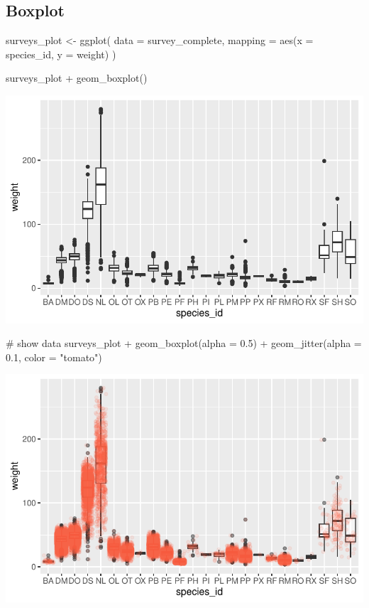 \documentclass[
  letterpaper,
  DIV=11,
  numbers=noendperiod]{scrreprt}
\newenvironment{Shaded}{\begin{snugshade}}{\end{snugshade}}
\newcommand{\AttributeTok}[1]{\textcolor[rgb]{0.40,0.45,0.13}{#1}}
\newcommand{\CommentTok}[1]{\textcolor[rgb]{0.37,0.37,0.37}{#1}}
\newcommand{\FloatTok}[1]{\textcolor[rgb]{0.68,0.00,0.00}{#1}}
\newcommand{\FunctionTok}[1]{\textcolor[rgb]{0.28,0.35,0.67}{#1}}
\newcommand{\NormalTok}[1]{\textcolor[rgb]{0.00,0.23,0.31}{#1}}
\newcommand{\OtherTok}[1]{\textcolor[rgb]{0.00,0.23,0.31}{#1}}
\newcommand{\SpecialCharTok}[1]{\textcolor[rgb]{0.37,0.37,0.37}{#1}}
\newcommand{\StringTok}[1]{\textcolor[rgb]{0.13,0.47,0.30}{#1}}
\begin{document}
\subsection{Boxplot}\label{boxplot}

\begin{Shaded}
\begin{Highlighting}[]
\NormalTok{surveys\_plot }\OtherTok{\textless{}{-}} \FunctionTok{ggplot}\NormalTok{(}
  \AttributeTok{data =}\NormalTok{ survey\_complete,}
  \AttributeTok{mapping =} \FunctionTok{aes}\NormalTok{(}\AttributeTok{x =}\NormalTok{ species\_id, }\AttributeTok{y =}\NormalTok{ weight)}
\NormalTok{)}

\NormalTok{surveys\_plot }\SpecialCharTok{+} \FunctionTok{geom\_boxplot}\NormalTok{()}
\end{Highlighting}
\end{Shaded}

\includegraphics{src/notebooks/r_files/figure-pdf/unnamed-chunk-50-1.pdf}

\begin{Shaded}
\begin{Highlighting}[]
\CommentTok{\# show data}
\NormalTok{surveys\_plot }\SpecialCharTok{+} \FunctionTok{geom\_boxplot}\NormalTok{(}\AttributeTok{alpha =} \FloatTok{0.5}\NormalTok{) }\SpecialCharTok{+}
  \FunctionTok{geom\_jitter}\NormalTok{(}\AttributeTok{alpha =} \FloatTok{0.1}\NormalTok{, }\AttributeTok{color =} \StringTok{"tomato"}\NormalTok{)}
\end{Highlighting}
\end{Shaded}

\includegraphics{src/notebooks/r_files/figure-pdf/unnamed-chunk-50-2.pdf}
\end{document}
